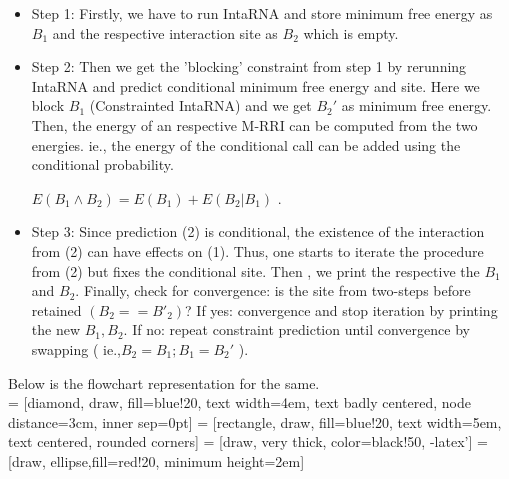 \documentclass[twoside,a4paper]{report}
\begin{document}
	 
	 \begin{itemize}
	 	 
	
	 \item Step 1: Firstly, we have to run IntaRNA and store minimum free energy as $B_1$ and the respective interaction site as $B_2$ which is empty.
	 \item Step 2: Then we get the 'blocking' constraint from step 1 by rerunning IntaRNA and predict conditional minimum free energy and site. Here we block $B_1$ (Constrainted IntaRNA) and we get $B_2'$ as minimum free energy. Then, the energy of an respective M-RRI can be computed from the two energies. ie., the energy of the conditional call can be added using the conditional probability.\\
	 \begin{center}
	 	 $E(B_1 \land B_2) = E(B_1) + E(B_2 | B_1)$ .
	 \end{center}
	 
	 \item Step 3: Since prediction (2) is conditional, the existence of the interaction from (2) can have effects on (1). Thus, one starts to iterate the procedure from (2) but fixes the conditional site. Then , we print the respective the $B_1$ and $B_2$. Finally, check for convergence: is the site from two-steps before retained $(B_2 == B'_2)$? If yes: convergence and stop iteration by printing the new $B_1 , B_2$. If no: repeat constraint prediction until convergence by swapping ( ie.,$B_2 = B_1; B_1 = B_2'$ ).
	 
	  \end{itemize}
  
%  	
  
  
  	Below is the flowchart representation for the same.\\
	
	 = [diamond, draw, fill=blue!20, 
	text width=4em, text badly centered, node distance=3cm, inner sep=0pt]
	 = [rectangle, draw, fill=blue!20, 
	text width=5em, text centered, rounded corners]
	 = [draw, very thick, color=black!50, -latex']
	 = [draw, ellipse,fill=red!20,
	minimum height=2em]
	
\end{document}
